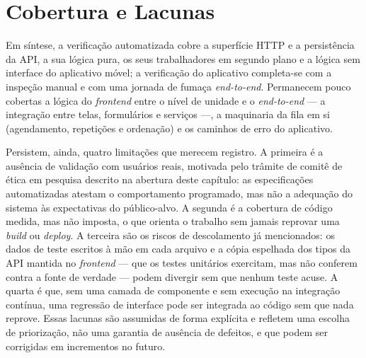 \section{Cobertura e Lacunas}\label{sec:test-gaps}

Em síntese, a verificação automatizada cobre a superfície HTTP e a persistência
da API, a sua lógica pura, os seus trabalhadores em segundo plano e a lógica
sem interface do aplicativo móvel; a verificação do aplicativo completa-se com a
inspeção manual e com uma jornada de fumaça \textit{end-to-end}. Permanecem
pouco cobertas a lógica do \textit{frontend} entre o nível de unidade e o
\textit{end-to-end} --- a integração entre telas, formulários e serviços ---, a
maquinaria da fila em si (agendamento, repetições e ordenação) e os caminhos de
erro do aplicativo.

Persistem, ainda, quatro limitações que merecem registro. A primeira é a ausência
de validação com usuários reais, motivada pelo trâmite de comitê de ética em
pesquisa descrito na abertura deste capítulo: as especificações automatizadas
atestam o comportamento programado, mas não a adequação do sistema às
expectativas do público-alvo. A segunda é a cobertura de código medida, mas não
imposta, o que orienta o trabalho sem jamais reprovar uma \textit{build} ou
\textit{deploy}. A terceira são os riscos de descolamento já mencionados: os
dados de teste escritos à mão em cada arquivo e a cópia espelhada dos tipos da
API mantida no \textit{frontend} --- que os testes unitários exercitam, mas não
conferem contra a fonte de verdade --- podem divergir sem que nenhum teste
acuse. A quarta é que, sem uma camada de componente e sem execução na
integração contínua, uma regressão de interface pode ser integrada ao código
sem que nada reprove. Essas lacunas são assumidas de forma explícita e
refletem uma escolha de priorização, não uma garantia de ausência de defeitos,
e que podem ser corrigidas em incrementos no futuro.
